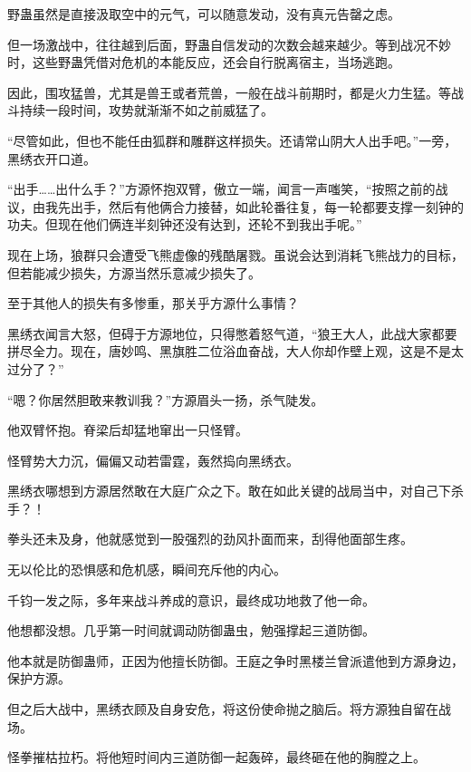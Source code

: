 
\begin{this_body}

野蛊虽然是直接汲取空中的元气，可以随意发动，没有真元告罄之虑。

但一场激战中，往往越到后面，野蛊自信发动的次数会越来越少。等到战况不妙时，这些野蛊凭借对危机的本能反应，还会自行脱离宿主，当场逃跑。

因此，围攻猛兽，尤其是兽王或者荒兽，一般在战斗前期时，都是火力生猛。等战斗持续一段时间，攻势就渐渐不如之前威猛了。

“尽管如此，但也不能任由狐群和雕群这样损失。还请常山阴大人出手吧。”一旁，黑绣衣开口道。

“出手……出什么手？”方源怀抱双臂，傲立一端，闻言一声嗤笑，“按照之前的战议，由我先出手，然后有他俩合力接替，如此轮番往复，每一轮都要支撑一刻钟的功夫。但现在他们俩连半刻钟还没有达到，还轮不到我出手呢。”

现在上场，狼群只会遭受飞熊虚像的残酷屠戮。虽说会达到消耗飞熊战力的目标，但若能减少损失，方源当然乐意减少损失了。

至于其他人的损失有多惨重，那关乎方源什么事情？

黑绣衣闻言大怒，但碍于方源地位，只得憋着怒气道，“狼王大人，此战大家都要拼尽全力。现在，唐妙鸣、黑旗胜二位浴血奋战，大人你却作壁上观，这是不是太过分了？”

“嗯？你居然胆敢来教训我？”方源眉头一扬，杀气陡发。

他双臂怀抱。脊梁后却猛地窜出一只怪臂。

怪臂势大力沉，偏偏又动若雷霆，轰然捣向黑绣衣。

黑绣衣哪想到方源居然敢在大庭广众之下。敢在如此关键的战局当中，对自己下杀手？！

拳头还未及身，他就感觉到一股强烈的劲风扑面而来，刮得他面部生疼。

无以伦比的恐惧感和危机感，瞬间充斥他的内心。

千钧一发之际，多年来战斗养成的意识，最终成功地救了他一命。

他想都没想。几乎第一时间就调动防御蛊虫，勉强撑起三道防御。

他本就是防御蛊师，正因为他擅长防御。王庭之争时黑楼兰曾派遣他到方源身边，保护方源。

但之后大战中，黑绣衣顾及自身安危，将这份使命抛之脑后。将方源独自留在战场。

怪拳摧枯拉朽。将他短时间内三道防御一起轰碎，最终砸在他的胸膛之上。


\end{this_body}
